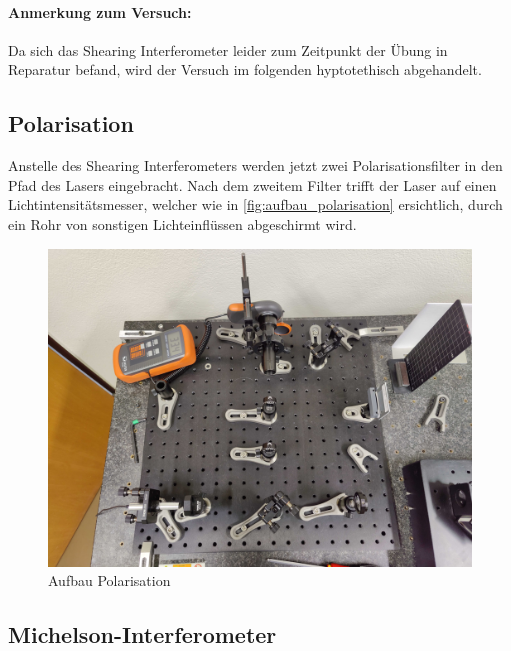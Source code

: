 \documentclass[ngerman]{scrartcl}
\begin{document}
\paragraph{Anmerkung zum Versuch:} Da sich das Shearing Interferometer leider zum Zeitpunkt der Übung in Reparatur befand, wird der Versuch im folgenden hyptotethisch abgehandelt.


\subsection{Polarisation}
\label{sec:aufbau_polarisation}

Anstelle des Shearing Interferometers werden jetzt zwei Polarisationsfilter in den Pfad des Lasers eingebracht. Nach dem zweitem Filter trifft der Laser auf einen Lichtintensitätsmesser, welcher wie in \autoref{fig:aufbau_polarisation} ersichtlich, durch ein Rohr von sonstigen Lichteinflüssen abgeschirmt wird.
%
\begin{figure}[H]
    \centering
    \begin{samepage}
        \includegraphics[width=0.7\linewidth]{fig/Compressed/Aufbau_polarisation.jpg}
        \caption{Aufbau Polarisation}
        \label{fig:aufbau_polarisation}
    \end{samepage}
\end{figure}


\subsection{Michelson-Interferometer}
\label{sec:aufbau_michelson}
\end{document}
